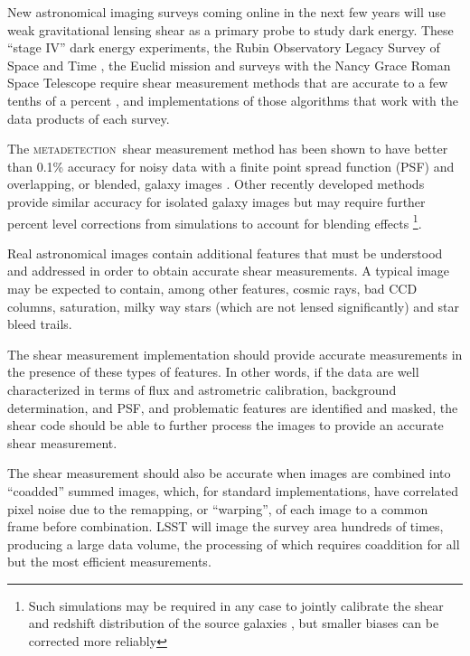 \documentclass[twocolumn,twocolappendix,astrosym]{openjournal}
\newcommand{\mdet}{\textsc{metadetection}}
\begin{document}
New astronomical imaging surveys coming online in the next few years will use
weak gravitational lensing shear as a primary probe to study dark energy.
These ``stage IV'' dark energy experiments, the Rubin Observatory Legacy Survey
of Space and Time \citep[LSST,][]{IvezicLSST2008}, the Euclid mission
\citep{Euclid2011} and surveys with the Nancy Grace Roman Space Telescope
\citep{Roman2015} require shear measurement methods that are accurate to a few
tenths of a percent \citep{Massey2013,SRD}, and implementations of those
algorithms that work with the data products of each survey.

The \mdet\ shear measurement method \citep{mdet20} has been shown to have
better than 0.1\% accuracy for noisy data with a finite point spread function
(PSF) and overlapping, or blended, galaxy images
\citep{mdet20,HoekstraMdet2021a,HoekstraMdet2021b}.  Other recently developed
methods provide similar accuracy for isolated galaxy images \citep{BernBFD2016,
LiFPFSBlending2022} but may require further percent level corrections from
simulations to account for blending effects
\citep{mdet20,LiFPFSBlending2022}\footnote{Such simulations may be required in
any case to jointly calibrate the shear and redshift distribution of the source
galaxies \citep{MacCrann2022,LiNofz2022}, but smaller biases can be corrected
more reliably}.

Real astronomical images contain additional features that must be understood
and addressed in order to obtain accurate shear measurements.  A typical image
may be expected to contain, among other features, cosmic rays, bad CCD columns,
saturation, milky way stars (which are not lensed significantly) and star bleed
trails.

The shear measurement implementation should provide accurate measurements in
the presence of these types of features.  In other words, if the data are well
characterized in terms of flux and astrometric calibration, background
determination, and PSF, and problematic features are identified and masked, the
shear code should be able to further process the images to provide an accurate
shear measurement.

The shear measurement should also be accurate when images are combined into
``coadded'' summed images, which, for standard implementations, have correlated
pixel noise due to the remapping, or ``warping'', of each image to a common
frame before combination.  LSST will image the survey area hundreds of times,
producing a large data volume, the processing of which requires coaddition for
all but the most efficient measurements.
\end{document}
